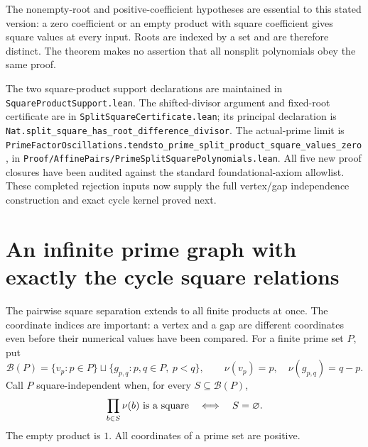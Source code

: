 \documentclass[11pt]{article}
\begin{document}
The nonempty-root and positive-coefficient hypotheses are essential
to this stated version: a zero coefficient or an empty product
with square coefficient gives square values at every input. Roots
are indexed by a set and are therefore distinct. The theorem makes
no assertion that all nonsplit polynomials obey the same proof.

The two square-product support declarations are maintained in
\texttt{SquareProductSupport.lean}. The shifted-divisor argument
and fixed-root certificate are in
\texttt{SplitSquareCertificate.lean}; its principal declaration is
\texttt{Nat.split\_square\_has\_root\_difference\_divisor}.
The actual-prime limit is
\texttt{PrimeFactorOscillations.tendsto\_prime\_split\_product\_square\_values\_zero},
in \texttt{Proof/AffinePairs/PrimeSplitSquarePolynomials.lean}.
All five new proof closures have been audited against the standard
foundational-axiom allowlist. These completed rejection inputs now supply the full vertex/gap
independence construction and exact cycle kernel proved next.

\section{An infinite prime graph with exactly the cycle square relations}
\label{sec:native-prime-cycle-kernel}

The pairwise square separation extends to all finite products at once.
The coordinate indices are important: a vertex and a gap are different
coordinates even before their numerical values have been compared.
For a finite prime set \(P\), put
\[
 \mathcal B(P)=\{v_p:p\in P\}\sqcup
              \{g_{p,q}:p,q\in P,\ p<q\},\qquad
 \nu(v_p)=p,\quad \nu(g_{p,q})=q-p.
\]
Call \(P\) square-independent when, for every \(S\subseteq\mathcal B(P)\),
\begin{equation}\label{eq:native-full-square-independence}
 \prod_{b\in S}\nu(b)\ \hbox{is a square}
 \quad\Longleftrightarrow\quad S=\varnothing.
\end{equation}
The empty product is \(1\). All coordinates of a prime set are positive.
\end{document}
